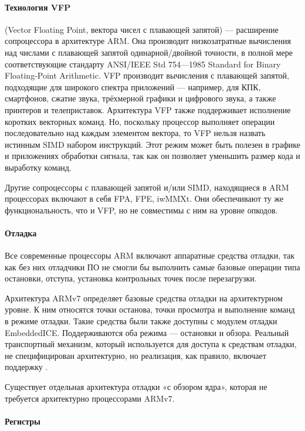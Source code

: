 \paragraph{Технология VFP}

 (Vector Floating Point, вектора чисел с плавающей запятой) — расширение 
 сопроцессора в архитектуре ARM. Она производит низкозатратные вычисления 
 над числами с плавающей запятой одинарной/двойной точности, в полной мере
  соответствующие стандарту ANSI/IEEE Std 754—1985 Standard for Binary
  Floating-Point Arithmetic. VFP производит вычисления с плавающей запятой, 
  подходящие для широкого спектра приложений — например, для КПК, смартфонов, 
  сжатие звука, трёхмерной графики и цифрового звука, а также принтеров и 
  телеприставок. Архитектура VFP также поддерживает исполнение коротких 
  векторных команд. Но, поскольку процессор выполняет операции 
  последовательно над каждым элементом вектора, то VFP нельзя назвать 
  истинным SIMD набором инструкций. Этот режим может быть полезен в графике 
  и приложениях обработки сигнала, так как он позволяет уменьшить размер кода 
  и выработку команд.

Другие сопроцессоры с плавающей запятой и/или SIMD, находящиеся в ARM 
процессорах включают в себя FPA, FPE, iwMMXt. Они обеспечивают ту же 
функциональность, что и VFP, но не совместимы с ним на уровне опкодов.

\paragraph{Отладка}

Все современные процессоры ARM включают аппаратные средства отладки, так как 
без них отладчики ПО не смогли бы выполнить самые базовые операции типа 
остановки, отступа, установка контрольных точек после перезагрузки.

Архитектура ARMv7 определяет базовые средства отладки на архитектурном 
уровне. К ним относятся точки останова, точки просмотра и выполнение команд 
в режиме отладки. Такие средства были также доступны с модулем отладки 
EmbeddedICE. Поддерживаются оба режима — остановки и обзора. Реальный 
транспортный механизм, который используется для доступа к средствам отладки, 
не специфицирован архитектурно, но реализация, как правило, включает 
поддержку \jtag.

Существует отдельная архитектура отладки «с обзором ядра», которая не 
требуется архитектурно процессорами ARMv7.

\paragraph{Регистры}

